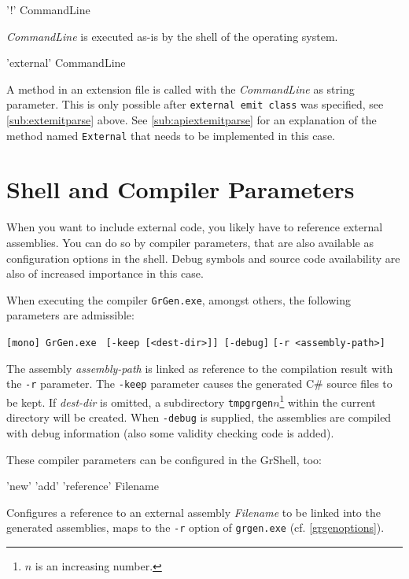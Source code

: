 \begin{rail}
  '!' CommandLine
\end{rail}
\emph{CommandLine} is executed as-is by the shell of the operating system.

\begin{rail}
  'external' CommandLine
\end{rail}
A method in an extension file is called with the \emph{CommandLine} as string parameter.
This is only possible after \texttt{external emit class} was specified, see \ref{sub:extemitparse} above.
See \ref{sub:apiextemitparse} for an explanation of the method named \texttt{External} that needs to be implemented in this case.

\pagebreak %

\section{Shell and Compiler Parameters}

When you want to include external code, you likely have to reference external assemblies.
You can do so by compiler parameters, that are also available as configuration options in the shell.
Debug symbols and source code availability are also of increased importance in this case.

When executing the compiler \texttt{GrGen.exe}, amongst others, the following parameters are admissible:

\noindent \texttt{[mono] GrGen.exe } \texttt{[-keep [<dest-dir>]] [-debug]} \texttt{[-r <assembly-path>]}

The assembly \emph{assembly-path} is linked as reference to the compilation result with the \texttt{-r} parameter.
The \texttt{-keep} parameter causes the generated C\# source files to be kept. If \emph{dest-dir} is omitted, a subdirectory \texttt{tmpgrgen$n$}\footnote{$n$ is an increasing number.} within the current directory will be created. 
When \texttt{-debug} is supplied, the assemblies are compiled with debug information (also some validity checking code is added).

These compiler parameters can be configured in the GrShell, too:
\begin{rail}
  'new' 'add' 'reference' Filename
\end{rail}
Configures a reference to an external assembly \emph{Filename} to be linked into the generated assemblies, maps to the \texttt{-r} option of \texttt{grgen.exe} (cf. \ref{grgenoptions}).

